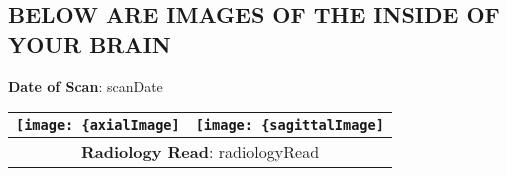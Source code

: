 \subsection{BELOW ARE IMAGES OF THE INSIDE OF YOUR BRAIN}

\textbf{Date of Scan}: {{scanDate}}

\setlength{\arrayrulewidth}{0.65mm}

\begin{table}[h!]
    \centering
    \begin{tabular}{cc}
        \texttt{[image: \{axialImage]}} & \texttt{[image: \{sagittalImage]}}
        \\ \hline
        \multicolumn{2}{c}{\parbox{0.8\textwidth}{\raggedright \vspace*{5mm} \textbf{Radiology Read}: {{radiologyRead}} \vspace*{5mm}}} 
        \\ \hline
    \end{tabular}
\end{table}
